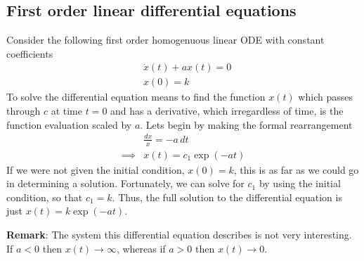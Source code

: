 \documentclass[a4paper,11pt]{exam}
\newcounter{ct}
\begin{document}
\begin{questions}
\subsection{First order linear differential equations}
Consider the following first order homogenuous linear ODE with constant coefficients
\begin{align}
    &\dot{x}(t) + a x(t) = 0\\
    &x(0) = k
\end{align}
To solve the differential equation means to find the function $x(t)$ which passes through $c$ at time $t=0$ and has a derivative, which irregardless of time, is the function evaluation scaled by $a$.  Lets begin by making the formal rearrangement
\begin{align}
    &\frac{dx}{x} = - a \, dt\\
    \implies &x(t) = c_1 \exp(-at)
\end{align}
If we were not given the initial condition, $x(0)=k$, this is as far as we could go in determining a solution.  Fortunately, we can solve for $c_1$ by using the initial condition, so that $c_1 = k$.  Thus, the full solution to the differential equation is just $x(t) = k \exp(-at)$.  

\textbf{Remark}: The system this differential equation describes is not very interesting.  If $a < 0$ then $x(t) \rightarrow \infty$, whereas if $a > 0$ then $x(t) \rightarrow 0$.


\end{questions}
\end{document}
